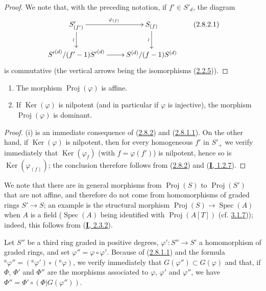 \begin{proof}
We note that, with the preceding notation, if $f'\in S'_d$, the diagram
\[
\label{II.2.8.2.1}
  \xymatrix{
    S'_{(f')}\ar[r]^{\varphi_{(f)}}\ar[d]_{\wr}
    & S_{(f)}\ar[d]_{\wr}\\
    {S'}^{(d)}/(f'-1){S'}^{(d)}\ar[r]
    & S^{(d)}/(f-1)S^{(d)}
  }
\tag{2.8.2.1}
\]
is commutative (the vertical arrows being the isomorphisms
(\hyperref[II.2.2.5]{2.2.5})).
\end{proof}

\begin{corollary}[2.8.3]
\label{II.2.8.3}
\begin{enumerate}
  \item[\rm(i)] The morphism $\operatorname{Proj}(\varphi)$ is affine.
  \item[\rm(ii)] If $\operatorname{Ker}(\varphi)$ is nilpotent (and in
    particular if $\varphi$ is injective), the morphism
    $\operatorname{Proj}(\varphi)$ is dominant.
\end{enumerate}
\end{corollary}

\begin{proof}
(i) is an immediate consequence of (\hyperref[II.2.8.2]{2.8.2}) and
(\hyperref[II.2.8.1.1]{2.8.1.1}). On the other hand, if
$\operatorname{Ker}(\varphi)$ is nilpotent, then for every homogeneous $f'$ in
$S'_+$ we verify immediately that $\operatorname{Ker}(\varphi_f)$ (with
$f=\varphi(f')$) is nilpotent, hence so is
$\operatorname{Ker}(\varphi_{(f)})$; the conclusion therefore follows from
(\hyperref[II.2.8.2]{2.8.2}) and
(\hyperref[I.1.2.7]{\textbf{I}, 1.2.7}).
\end{proof}

We note that there are in general morphisms from $\operatorname{Proj}(S)$
to $\operatorname{Proj}(S')$ that are not affine, and therefore do not come
from homomorphisms of graded rings $S'\to S$; an example is the structural
morphism $\operatorname{Proj}(S)\to\operatorname{Spec}(A)$ when $A$ is a field
($\operatorname{Spec}(A)$ being identified with
$\operatorname{Proj}(A[T])$ (cf. \hyperref[II.3.1.7]{3.1.7})); indeed,
this follows from (\hyperref[I.2.3.2]{\textbf{I}, 2.3.2}).

\begin{env}[2.8.4]
\label{II.2.8.4}
Let $S''$ be a third ring graded in positive degrees,
$\varphi':S''\to S'$ a homomorphism of graded rings, and set
$\varphi''=\varphi\circ\varphi'$. Because of
(\hyperref[II.2.8.1.1]{2.8.1.1}) and the formula
${}^a\varphi''=({}^a\varphi')\circ({}^a\varphi)$, we verify immediately that
$G(\varphi'')\subset G(\varphi)$ and that, if $\Phi$, $\Phi'$ and $\Phi''$
are the morphisms associated to $\varphi$, $\varphi'$ and $\varphi''$, we have
$\Phi''=\Phi'\circ(\Phi|G(\varphi''))$.
\end{env}

